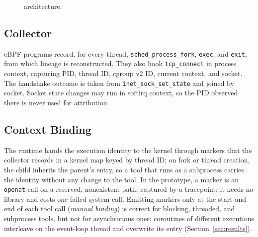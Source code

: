 \begin{figure}[!h]
\caption{\solution{} architecture.}
\label{fig:arch}
\end{figure}

\subsection{Collector}

eBPF programs record, for every thread, \texttt{sched\_process\_fork}, \texttt{exec}, and \texttt{exit}, from which lineage is reconstructed. They also hook \texttt{tcp\_connect} in process context, capturing PID, thread ID, cgroup v2 ID, current context, and socket. The handshake outcome is taken from \texttt{inet\_sock\_set\_state} and joined by socket. Socket state changes may run in softirq context, so the PID observed there is never used for attribution.

\subsection{Context Binding}

The runtime hands the execution identity to the kernel through markers that the collector records in a kernel map keyed by thread ID; on fork or thread creation, the child inherits the parent's entry, so a tool that runs as a subprocess carries the identity without any change to the tool. In the prototype, a marker is an \texttt{openat} call on a reserved, nonexistent path, captured by a tracepoint; it needs no library and costs one failed system call. Emitting markers only at the start and end of each tool call (\emph{manual binding}) is correct for blocking, threaded, and subprocess tools, but not for asynchronous ones: coroutines of different executions interleave on the event-loop thread and overwrite its entry (Section~\ref{sec:results}).

